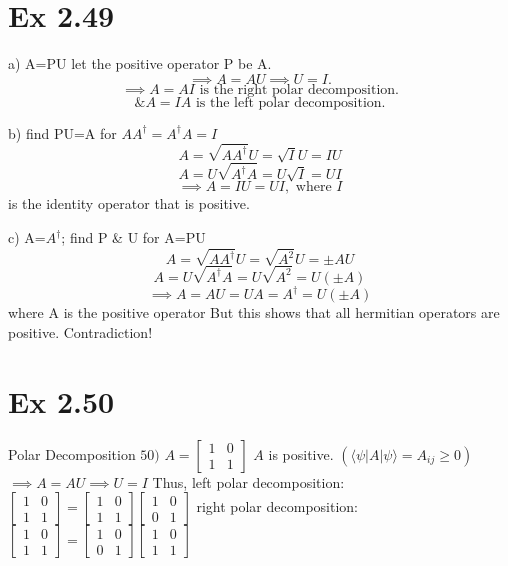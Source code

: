 \documentclass{article}
\newcommand{\0}{{$|0\rangle$}}
\newcommand{\1}{{$|1\rangle$}}
\begin{document}
\newpage
\newpage
\section*{Ex 2.49 }
a) A=PU
let the positive operator P be A.
$$
\implies A=AU \implies U=I.
$$
$$
\implies A=AI \text{ is the right polar decomposition.}
$$
$$
\& A=IA \text{ is the left polar decomposition.}
$$

b) find PU=A for $AA^\dagger = A^\dagger A = I$
$$
A = \sqrt{AA^\dagger} U = \sqrt{I} U = IU
$$
$$
A = U\sqrt{A^\dagger A} = U\sqrt{I} = UI
$$
$$
\implies A = IU = UI, \text{ where } I
$$
is the identity operator that
is positive.

c) A=$A^\dagger$; find P \& U for A=PU
$$
A=\sqrt{AA^\dagger} U = \sqrt{A^2} U = \pm AU
$$
$$
A=U\sqrt{A^\dagger A} = U\sqrt{A^2} = U(\pm A)
$$
$$
\implies A = AU = UA=A^\dagger = U(\pm A)
$$
where A is
the positive operator
But this shows that all hermitian operators
are positive. Contradiction!


\newpage
\section*{Ex 2.50}
Polar Decomposition  
$50)$ $A=\begin{bmatrix} 1 & 0 \\ 1 & 1 \end{bmatrix}$  
$A$ is positive. $(\langle\psi|A|\psi\rangle = A_{ij} \geq 0)$  
$\implies A=AU \implies U=I$  
Thus, left polar decomposition:  
$\begin{bmatrix} 1 & 0 \\ 1 & 1 \end{bmatrix} = \begin{bmatrix} 1 & 0 \\ 1 & 1 \end{bmatrix} \begin{bmatrix} 1 & 0 \\ 0 & 1 \end{bmatrix}$  
right polar decomposition:  
$\begin{bmatrix} 1 & 0 \\ 1 & 1 \end{bmatrix} = \begin{bmatrix} 1 & 0 \\ 0 & 1 \end{bmatrix} \begin{bmatrix} 1 & 0 \\ 1 & 1 \end{bmatrix}$
\end{document}
